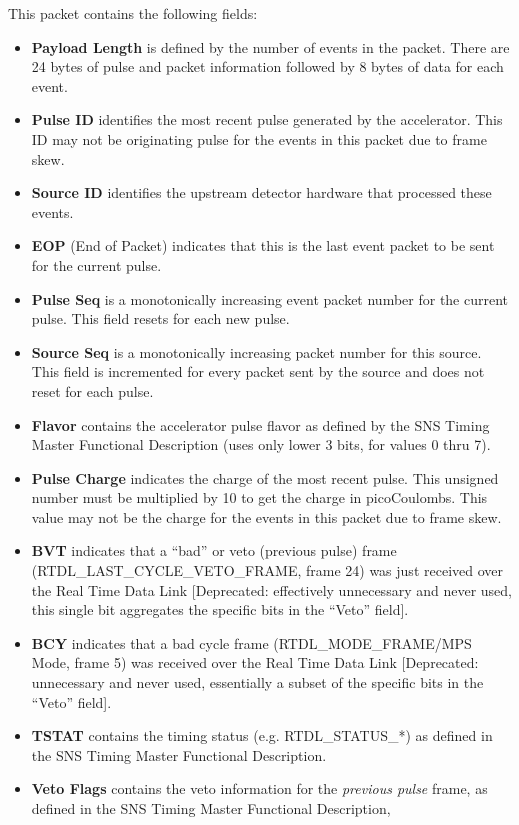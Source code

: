 This packet contains the following fields:
\begin{itemize}
\item{\bf Payload Length} is defined by the number of events in the packet.
There are 24 bytes of pulse and packet information followed by 8 bytes of
data for each event.
\item{\bf Pulse ID} identifies the most recent pulse generated by the
accelerator. This ID may not be originating pulse for the events
in this packet due to frame skew.
\item{\bf Source ID} identifies the upstream detector hardware that
processed these events.
\item{\bf EOP} (End of Packet) indicates that this is the last event packet
to be sent for the current pulse.
\item{\bf Pulse Seq} is a monotonically increasing event packet number
for the current pulse.
This field resets for each new pulse.
\item{\bf Source Seq} is a monotonically increasing packet number
for this source.
This field is incremented for every packet sent by the source and does not
reset for each pulse.
\item{\bf Flavor} contains the accelerator pulse flavor as defined by
the SNS Timing Master Functional Description
(uses only lower 3 bits, for values 0 thru 7).
\item{\bf Pulse Charge} indicates the charge of the most recent pulse. This
unsigned number must be multiplied by 10 to get the charge in picoCoulombs. This
value may not be the charge for the events in this packet due to frame skew.
\item{\bf BVT} indicates that a ``bad'' or veto (previous pulse) frame
(RTDL\_LAST\_CYCLE\_VETO\_FRAME, frame 24) was just received over the
Real Time Data Link [Deprecated: effectively unnecessary and never used,
this single bit aggregates the specific bits in the ``Veto'' field].
\item{\bf BCY} indicates that a bad cycle frame
(RTDL\_MODE\_FRAME/MPS Mode, frame 5) was received over the
Real Time Data Link
[Deprecated: unnecessary and never used, essentially a subset of the
specific bits in the ``Veto'' field].
\item{\bf TSTAT} contains the timing status
(e.g. RTDL\_STATUS\_*) as defined in the SNS Timing Master
Functional Description.
\item{\bf Veto Flags} contains the veto information
for the {\it previous pulse} frame,
as defined in the SNS Timing Master Functional Description,

\end{itemize}
